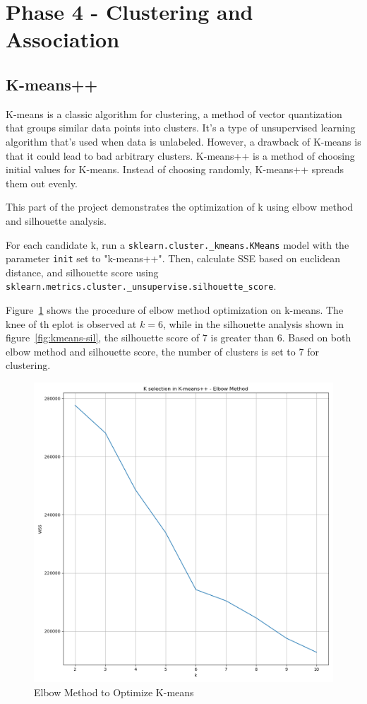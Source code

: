 \section{Phase 4 - Clustering and Association}

\subsection{K-means++}

K-means is a classic algorithm for clustering, a method of vector quantization that groups similar data points into clusters. It's a type of unsupervised learning algorithm that's used when data is unlabeled. However, a drawback of K-means is that it could lead to bad arbitrary clusters. K-means++ is a method of choosing initial values for K-means. Instead of choosing randomly, K-means++ spreads them out evenly.

This part of the project demonstrates the optimization of k using elbow method and silhouette analysis.

For each candidate k, run a \texttt{sklearn.cluster.\_kmeans.KMeans} model with the parameter \texttt{init} set to "k-means++". Then, calculate SSE based on euclidean distance, and silhouette score using \\ \texttt{sklearn.metrics.cluster.\_unsupervise.silhouette\_score}.

Figure~\ref{fig:kmeans-elbow} shows the procedure of elbow method optimization on k-means. The knee of th eplot is observed at $k = 6$, while in the silhouette analysis shown in figure~\ref{fig:kmeans-sil}, the silhouette score of 7 is greater than 6. Based on both elbow method and silhouette score, the number of clusters is set to 7 for clustering.

\begin{figure}
    \centering
    \includegraphics[width=1\linewidth]{docs//assets/kmeans_elbow_method.png}
    \caption{Elbow Method to Optimize K-means}
    \label{fig:kmeans-elbow}
\end{figure}

